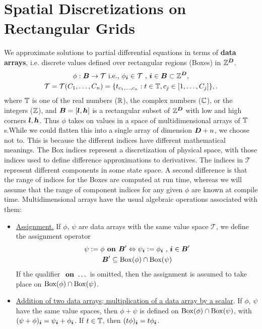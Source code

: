 \documentclass[12pt]{article}
\begin{document}
\section{Spatial Discretizations on Rectangular Grids}

We approximate solutions to partial differential equations in terms of \textbf{data arrays}, i.e. discrete values defined over rectangular regions (Boxes) in $\mathbb{Z}^{\boldsymbol{D}}$.
\begin{gather}
\phi:{\boldsymbol{B}} \rightarrow \mathcal{T} \hbox{ i.e., } \phi_{\boldsymbol{i}} \in \mathcal{T} \hbox{ , } 
{\boldsymbol{i}} \in {\boldsymbol{B}} \subset \mathbb{Z}^{\boldsymbol{D}} , \label{eqn:rectArr}\\ 
\mathcal{T} = \mathcal{T}(C_1, \dots , C_n) = \{t_{c_1, \dots , c_n}: t \in \mathbb{T}, c_j \in [1, \dots , C_j]\}, \label{eqn:codomain}.
\end{gather}
where $\mathbb{T}$ is one of the real numbers ($\mathbb{R}$), the complex numbers ($\mathbb{C}$), or the integers ($\mathbb{Z}$), and ${\boldsymbol{B}} = [{\boldsymbol{l}},{\boldsymbol{h}}]$ is a rectangular subset of $\mathbb{Z}^{\boldsymbol{D}}$ with low and high corners ${\boldsymbol{l}},{\boldsymbol{h}}$. Thus $\phi$ takes on values in a space of multidimensional arrays of $\mathbb{T}$s.While we could flatten this into a single array of dimension ${\boldsymbol{D}} + n$, we choose not to. This is because the different indices have different mathematical meanings. The Box indices represent a discretization of physical space, with those indices used to define difference approximations to derivatives. The indices in $\mathcal{T}$ represent different components in some state space. A second difference is that the range of indices for the Boxes are computed at run time, whereas we will assume that the range of component indices for any given $\phi$ are known at compile time. Multidimensional arrays have the usual algebraic operations associated with them:
\begin{itemize}
\item
\underline{Assignment.} If $\phi$, $\psi$ are data arrays with the same value space $\mathcal{T}$, we define the assignment operator 
\begin{gather*}
\psi := \phi \hbox{\bf{ on }} {\boldsymbol{B}}' \Leftrightarrow \psi_{\boldsymbol{i}} := \phi_{\boldsymbol{i}} \hbox{ , } {\boldsymbol{i}} \in {\boldsymbol{B}}'\\
 {\boldsymbol{B}}'\subseteq {\rm Box}(\phi) \cap {\rm Box}(\psi)
\end{gather*}
If the qualifier $\hbox{\bf{ on }} \dots$ is omitted, then the assignment is assumed to take place on  ${\rm Box}(\phi) \cap {\rm Box}(\psi)$.
\item
\underline{Addition of two data arrays; multiplication of a data array by a scalar}. If $\phi$, $\psi$ have the same value spaces, then $\phi + \psi$ is defined on ${\rm Box}(\phi) \cap {\rm Box}(\psi)$, with 
$(\psi + \phi)_{\boldsymbol{i}} = \psi_{\boldsymbol{i}} + \phi_{\boldsymbol{i}}$. If $t \in \mathbb{T}$, then 
$(t \phi )_{\boldsymbol{i}} = t \phi_{\boldsymbol{i}}$. 
\end{itemize}
\end{document}
